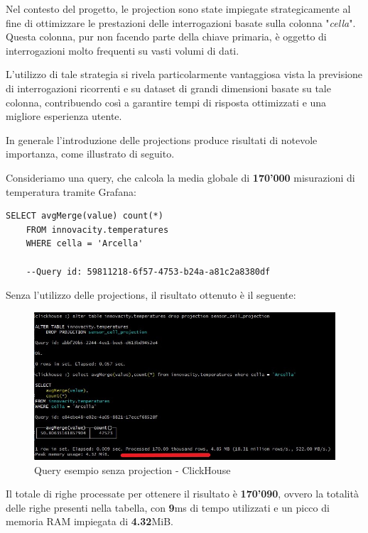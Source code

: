 Nel contesto del progetto, le projection sono state impiegate strategicamente al fine di ottimizzare le prestazioni delle interrogazioni basate sulla colonna "\textit{cella}". Questa colonna, pur non facendo parte della chiave primaria, è oggetto di interrogazioni molto frequenti su vasti volumi di dati.

L'utilizzo di tale strategia si rivela particolarmente vantaggiosa vista la previsione di interrogazioni ricorrenti e su dataset di grandi dimensioni basate su tale colonna, contribuendo così a garantire tempi di risposta ottimizzati e una migliore esperienza utente.

In generale l'introduzione delle projections produce risultati di notevole importanza, come illustrato di seguito.

Consideriamo una query, che calcola la media globale di \textbf{170'000} misurazioni di temperatura tramite Grafana:

\begin{lstlisting}[caption={Esempio query - Grafana}, captionpos=b]
	SELECT avgMerge(value) count(*)
	FROM innovacity.temperatures
	WHERE cella = 'Arcella'

	--Query id: 59811218-6f57-4753-b24a-a81c2a8380df
\end{lstlisting}

Senza l'utilizzo delle projections, il risultato ottenuto è il seguente:

\begin{figure}[H]
    \centering
    \includegraphics[width=1\textwidth]{../Images/SpecificaTecnica/query2ProjectionsWithout.jpg}
    \caption{Query esempio senza projection - ClickHouse}
    \label{fig:without2proj}
  \end{figure}

Il totale di righe processate per ottenere il risultato è  \textbf{170'090}, ovvero la totalità delle righe presenti nella tabella, con \textbf{9}ms di tempo utilizzati e un picco di memoria RAM impiegata di \textbf{4.32}MiB.


